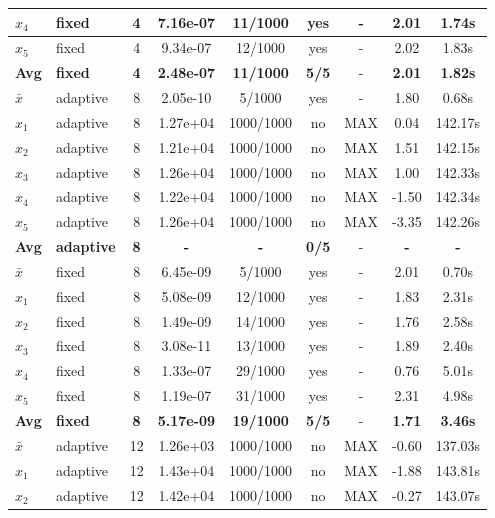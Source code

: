 \begin{longtable}{|l|l|c|c|c|c|c|c|c|}
\hline
$x_4$ & fixed & 4 & 7.16e-07 & 11/1000 & yes & - & 2.01 & 1.74s \\
\hline
$x_5$ & fixed & 4 & 9.34e-07 & 12/1000 & yes & - & 2.02 & 1.83s \\
\hline
\hline\hline
\textbf{Avg} & \textbf{fixed} & \textbf{4} & \textbf{2.48e-07} & \textbf{11/1000} & \textbf{5/5} & - & \textbf{2.01} & \textbf{1.82s} \\
\hline\hline
$\bar{x}$ & adaptive & 8 & 2.05e-10 & 5/1000 & yes & - & 1.80 & 0.68s \\
\hline
$x_1$ & adaptive & 8 & 1.27e+04 & 1000/1000 & no & MAX & 0.04 & 142.17s \\
\hline
$x_2$ & adaptive & 8 & 1.21e+04 & 1000/1000 & no & MAX & 1.51 & 142.15s \\
\hline
$x_3$ & adaptive & 8 & 1.26e+04 & 1000/1000 & no & MAX & 1.00 & 142.33s \\
\hline
$x_4$ & adaptive & 8 & 1.22e+04 & 1000/1000 & no & MAX & -1.50 & 142.34s \\
\hline
$x_5$ & adaptive & 8 & 1.26e+04 & 1000/1000 & no & MAX & -3.35 & 142.26s \\
\hline
\hline\hline
\textbf{Avg} & \textbf{adaptive} & \textbf{8} & \textbf{-} & \textbf{-} & \textbf{0/5} & - & \textbf{-} & \textbf{-} \\
\hline\hline
\hline
$\bar{x}$ & fixed & 8 & 6.45e-09 & 5/1000 & yes & - & 2.01 & 0.70s \\
\hline
$x_1$ & fixed & 8 & 5.08e-09 & 12/1000 & yes & - & 1.83 & 2.31s \\
\hline
$x_2$ & fixed & 8 & 1.49e-09 & 14/1000 & yes & - & 1.76 & 2.58s \\
\hline
$x_3$ & fixed & 8 & 3.08e-11 & 13/1000 & yes & - & 1.89 & 2.40s \\
\hline
$x_4$ & fixed & 8 & 1.33e-07 & 29/1000 & yes & - & 0.76 & 5.01s \\
\hline
$x_5$ & fixed & 8 & 1.19e-07 & 31/1000 & yes & - & 2.31 & 4.98s \\
\hline
\hline\hline
\textbf{Avg} & \textbf{fixed} & \textbf{8} & \textbf{5.17e-09} & \textbf{19/1000} & \textbf{5/5} & - & \textbf{1.71} & \textbf{3.46s} \\
\hline\hline
$\bar{x}$ & adaptive & 12 & 1.26e+03 & 1000/1000 & no & MAX & -0.60 & 137.03s \\
\hline
$x_1$ & adaptive & 12 & 1.43e+04 & 1000/1000 & no & MAX & -1.88 & 143.81s \\
\hline
$x_2$ & adaptive & 12 & 1.42e+04 & 1000/1000 & no & MAX & -0.27 & 143.07s \\

\end{longtable}
